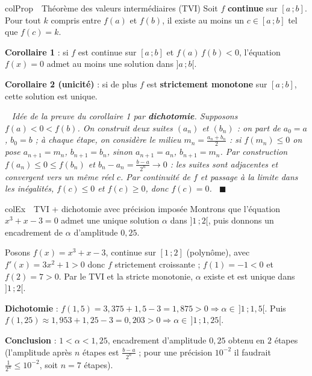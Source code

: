 \documentclass[11pt,a4paper]{article}
\newenvironment{propriete}[1][Propriété]
  {\begin{fiche}{colProp}{\ding{72}~~#1}}{\end{fiche}}
\newenvironment{exemple}[1][Exemple]
  {\begin{fiche}{colEx}{\ding{217}~~#1}}{\end{fiche}}
\newenvironment{demo}
  {\par\smallskip\noindent{\sffamily\bfseries\color{qtealdark}Démonstration.}\ \itshape}
  {\ \normalfont\hfill$\blacksquare$\par\medskip}
\begin{document}
\begin{propriete}[Théorème des valeurs intermédiaires (TVI)]
Soit $f$ \textbf{continue} sur $[a\,;b]$. Pour tout $k$ compris entre $f(a)$ et $f(b)$, il existe au moins un $c \in [a\,;b]$ tel que $f(c) = k$.

\smallskip
\textbf{Corollaire 1} : si $f$ est continue sur $[a\,;b]$ et $f(a)\,f(b) < 0$, l'équation $f(x) = 0$ admet au moins une solution dans $]a\,;b[$.

\smallskip
\textbf{Corollaire 2 (unicité)} : si de plus $f$ est \textbf{strictement monotone} sur $[a\,;b]$, cette solution est unique.
\end{propriete}

\begin{demo}
Idée de la preuve du corollaire 1 par \textbf{dichotomie}. Supposons $f(a) < 0 < f(b)$. On construit deux suites $(a_n)$ et $(b_n)$ : on part de $a_0 = a$, $b_0 = b$ ; à chaque étape, on considère le milieu $m_n = \frac{a_n + b_n}{2}$ : si $f(m_n) \leq 0$ on pose $a_{n+1} = m_n$, $b_{n+1} = b_n$, sinon $a_{n+1} = a_n$, $b_{n+1} = m_n$. Par construction $f(a_n) \leq 0 \leq f(b_n)$ et $b_n - a_n = \frac{b - a}{2^n} \to 0$ : les suites sont adjacentes et convergent vers un même réel $c$. Par continuité de $f$ et passage à la limite dans les inégalités, $f(c) \leq 0$ et $f(c) \geq 0$, donc $f(c) = 0$.
\end{demo}

\begin{exemple}[TVI + dichotomie avec précision imposée]
Montrons que l'équation $x^3 + x - 3 = 0$ admet une unique solution $\alpha$ dans $]1\,;2[$, puis donnons un encadrement de $\alpha$ d'amplitude $0{,}25$.

\smallskip
Posons $f(x) = x^3 + x - 3$, continue sur $[1\,;2]$ (polynôme), avec $f'(x) = 3x^2 + 1 > 0$ donc $f$ strictement croissante ; $f(1) = -1 < 0$ et $f(2) = 7 > 0$. Par le TVI et la stricte monotonie, $\alpha$ existe et est unique dans $]1\,;2[$.

\smallskip
\textbf{Dichotomie} : $f(1{,}5) = 3{,}375 + 1{,}5 - 3 = 1{,}875 > 0 \Rightarrow \alpha \in\, ]1\,;1{,}5[$. Puis $f(1{,}25) \approx 1{,}953 + 1{,}25 - 3 = 0{,}203 > 0 \Rightarrow \alpha \in\, ]1\,;1{,}25[$.

\smallskip
\textbf{Conclusion} : $1 < \alpha < 1{,}25$, encadrement d'amplitude $0{,}25$ obtenu en $2$ étapes (l'amplitude après $n$ étapes est $\frac{b - a}{2^n}$ ; pour une précision $10^{-2}$ il faudrait $\frac{1}{2^n} \leq 10^{-2}$, soit $n = 7$ étapes).
\end{exemple}
\end{document}
